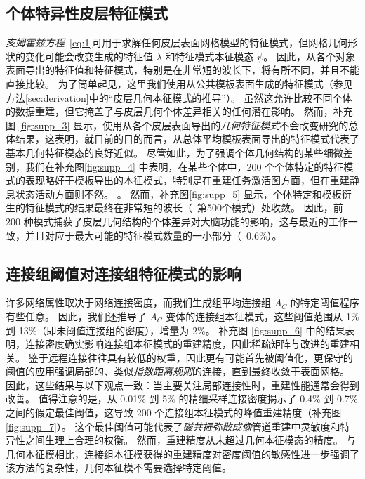 \documentclass[lang=cn,a4paper,newtx]{elegantpaper}
\begin{document}
\subsection{个体特异性皮层特征模式} \label{sec:individual_specific}
\textit{亥姆霍兹方程}~\ref{eq:1}可用于求解任何皮层表面网格模型的特征模式，但网格几何形状的变化可能会改变生成的特征值 $ \lambda $ 和特征模式本征模态 $ \psi $。
因此，从各个对象表面导出的特征值和特征模式，特别是在非常短的波长下，将有所不同，并且不能直接比较\cite{henderson2022empirical,chen2022individuality}。
为了简单起见，这里我们使用从公共模板表面生成的特征模式（参见方法\ref{sec:derivation}中的“皮层几何本征模式的推导”）。
虽然这允许比较不同个体的数据重建，但它掩盖了与皮层几何个体差异相关的任何潜在影响。
然而，补充图 \ref{fig:supp_3} 显示，使用从各个皮层表面导出的\textit{几何特征模式}不会改变研究的总体结果，这表明，就目前的目的而言，从总体平均模板表面导出的特征模式代表了基本几何特征模态的良好近似。
尽管如此，为了强调个体几何结构的某些细微差别，我们在补充图\ref{fig:supp_4} 中表明，在某些个体中，200 个个体特定的特征模式的表现略好于模板导出的本征模式，特别是在重建任务激活图方面，但在重建静息状态活动方面则不然。 。 
然而，补充图\ref{fig:supp_5} 显示，个体特定和模板衍生的特征模式的结果最终在非常短的波长（~第500个模式）处收敛。
因此，前 200 种模式捕获了皮层几何结构的个体差异对大脑功能的影响，这与最近的工作\cite{chen2022individuality}一致，并且对应于最大可能的特征模式数量的一小部分（~0.6\%）。


\subsection{连接组阈值对连接组特征模式的影响} \label{sec:thresholding_effect}

许多网络属性取决于网络连接密度，而我们生成组平均连接组 $ A_C $ 的特定阈值程序有些任意。
因此，我们还推导了 $ A_C $ 变体的连接组本征模式，这些阈值范围从 1\% 到 13\%（即未阈值连接组的密度），增量为 2\%。
补充图 \ref{fig:supp_6} 中的结果表明，连接密度确实影响连接组本征模式的重建精度，因此稀疏矩阵与改进的重建相关。
鉴于远程连接往往具有较低的权重，因此更有可能首先被阈值化，更保守的阈值的应用强调局部的、类似\textit{指数距离规则}的连接，直到最终收敛于表面网格。
因此，这些结果与以下观点一致：当主要关注局部连接性时，重建性能通常会得到改善。
值得注意的是，从 0.01\% 到 5\% 的精细采样连接密度揭示了 0.4\% 到 0.7\% 之间的假定最佳阈值，这导致 200 个连接组本征模式的峰值重建精度（补充图 \ref{fig:supp_7}）。
这个最佳阈值可能代表了\textit{磁共振弥散成像}管道重建中灵敏度和特异性之间生理上合理的权衡。
然而，重建精度从未超过几何本征模态的精度。
与几何本征模相比，连接组本征模获得的重建精度对密度阈值的敏感性进一步强调了该方法的复杂性，几何本征模不需要选择特定阈值。
\end{document}
